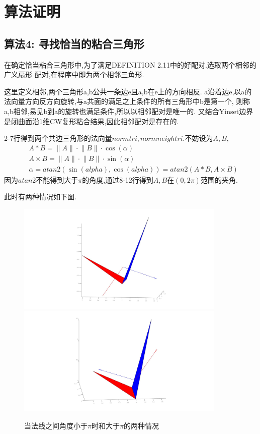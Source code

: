 \documentclass[a4paper]{book}
\numberwithin{equation}{chapter}
\theoremstyle{definition}
\begin{document}
\section{算法证明}
\subsection{算法4: 寻找恰当的粘合三角形}
在确定恰当粘合三角形中,为了满足DEFINITION 2.11中的好配对.选取两个相邻的广义扇形
配对,在程序中即为两个相邻三角形.

这里定义相邻,两个三角形a,b公共一条边e且a,b在e上的方向相反.
a沿着边e,以a的法向量方向反方向旋转,与a共面的满足之上条件的所有三角形中b是第一个,
则称a,b相邻,易见b到a的旋转也满足条件,所以以相邻配对是唯一的.
又结合Yinset边界是闭曲面沿1维CW复形粘合结果,因此相邻配对是存在的.

2-7行得到两个共边三角形的法向量$normtri,normneightri$.不妨设为$A,B$,
\begin{align}
	&A * B = \lVert A \rVert \cdot \lVert B \rVert \cdot \cos(\alpha) \\
	&A \times B = \lVert A \rVert \cdot \lVert B \rVert \cdot \sin(\alpha) \\
	&\alpha = atan2(\sin(alpha), \cos(alpha)) = atan2(A * B, A \times B) 
\end{align}
因为$atan2$不能得到大于$\pi$的角度,通过8-12行得到$A,B$在$(0,2\pi)$范围的夹角.

此时有两种情况如下图.
\begin{figure}
	\caption{当法线之间角度小于$\pi$时和大于$\pi$的两种情况}
	\includegraphics[width=10cm]{nearsituation1.jpg}
	\includegraphics[width=10cm]{nearsituation2.jpg}
\end{figure}
\end{document}
